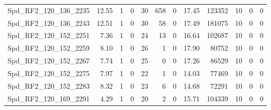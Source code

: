 \begin{longtable}[c]{@{}lrrrrrrrrrrr@{}}
Spd\_RF2\_120\_136\_2235     & 12.55                  & 1                       & 0                       & 30                     & 658                     & 0                       & 17.45                   & 123352                   & 10                       & 0                        & 0                        \\
Spd\_RF2\_120\_136\_2243     & 12.51                  & 1                       & 0                       & 30                     & 58                      & 0                       & 17.49                   & 181075                   & 10                       & 0                        & 0                        \\
Spd\_RF2\_120\_152\_2251     & 7.36                   & 1                       & 0                       & 24                     & 13                      & 0                       & 16.64                   & 102687                   & 10                       & 0                        & 0                        \\
Spd\_RF2\_120\_152\_2259     & 8.10                   & 1                       & 0                       & 26                     & 1                       & 0                       & 17.90                   & 80752                    & 10                       & 0                        & 0                        \\
Spd\_RF2\_120\_152\_2267     & 7.74                   & 1                       & 0                       & 25                     & 0                       & 0                       & 17.26                   & 86529                    & 10                       & 0                        & 0                        \\
Spd\_RF2\_120\_152\_2275     & 7.97                   & 1                       & 0                       & 22                     & 1                       & 0                       & 14.03                   & 77469                    & 10                       & 0                        & 0                        \\
Spd\_RF2\_120\_152\_2283     & 8.32                   & 1                       & 0                       & 23                     & 6                       & 0                       & 14.68                   & 72291                    & 10                       & 0                        & 0                        \\
Spd\_RF2\_120\_169\_2291     & 4.29                   & 1                       & 0                       & 20                     & 2                       & 0                       & 15.71                   & 104339                   & 10                       & 0                        & 0                        \\

\end{longtable}
